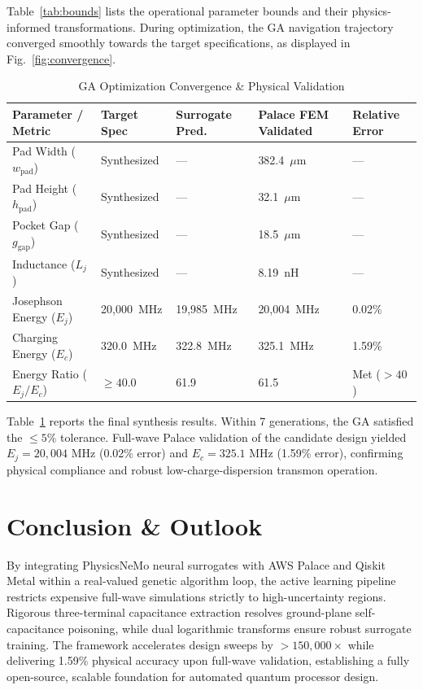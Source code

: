 \documentclass[journal,10pt,twocolumn]{IEEEtran}
\begin{document}
Table~\ref{tab:bounds} lists the operational parameter bounds and their physics-informed transformations. During optimization, the GA navigation trajectory converged smoothly towards the target specifications, as displayed in Fig.~\ref{fig:convergence}.

\begin{table}[!t]
\renewcommand{\arraystretch}{1.15}
\caption{GA Optimization Convergence \& Physical Validation}
\label{tab:results}
\centering
\begin{tabular}{lllll}
\toprule
\textbf{Parameter / Metric} & \textbf{Target Spec} & \textbf{Surrogate Pred.} & \textbf{Palace FEM Validated} & \textbf{Relative Error} \\
\midrule
Pad Width ($w_{\text{pad}}$) & Synthesized & --- & 382.4~$\mu$m & --- \\
Pad Height ($h_{\text{pad}}$) & Synthesized & --- & 32.1~$\mu$m & --- \\
Pocket Gap ($g_{\text{gap}}$) & Synthesized & --- & 18.5~$\mu$m & --- \\
Inductance ($L_j$) & Synthesized & --- & 8.19~nH & --- \\
Josephson Energy ($E_j$) & 20,000~MHz & 19,985~MHz & 20,004~MHz & 0.02\% \\
Charging Energy ($E_c$) & 320.0~MHz & 322.8~MHz & 325.1~MHz & 1.59\% \\
Energy Ratio ($E_j / E_c$) & $\ge 40.0$ & 61.9 & 61.5 & Met ($> 40$) \\
\bottomrule
\end{tabular}
\end{table}

Table~\ref{tab:results} reports the final synthesis results. Within 7 generations, the GA satisfied the $\le 5\%$ tolerance. Full-wave Palace validation of the candidate design yielded $E_j = 20,004\text{ MHz}$ (0.02\% error) and $E_c = 325.1\text{ MHz}$ (1.59\% error), confirming physical compliance and robust low-charge-dispersion transmon operation.

\section{Conclusion \& Outlook}
By integrating PhysicsNeMo neural surrogates with AWS Palace and Qiskit Metal within a real-valued genetic algorithm loop, the active learning pipeline restricts expensive full-wave simulations strictly to high-uncertainty regions. Rigorous three-terminal capacitance extraction resolves ground-plane self-capacitance poisoning, while dual logarithmic transforms ensure robust surrogate training. The framework accelerates design sweeps by $> 150,000\times$ while delivering 1.59\% physical accuracy upon full-wave validation, establishing a fully open-source, scalable foundation for automated quantum processor design.
\end{document}
